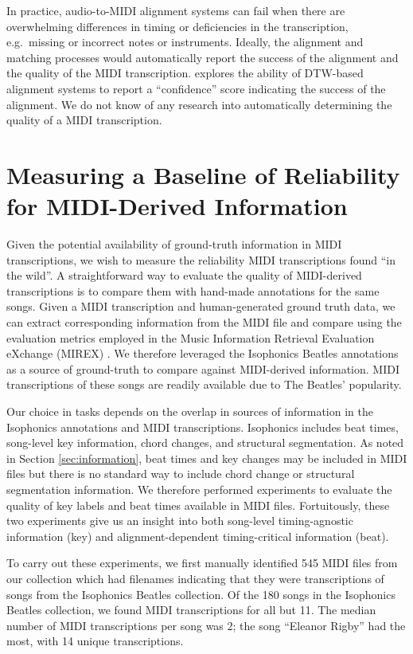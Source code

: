 \documentclass{article}
\begin{document}
In practice, audio-to-MIDI alignment systems can fail when there are overwhelming differences in timing or deficiencies in the transcription, e.g.\ missing or incorrect notes or instruments.
Ideally, the alignment and matching processes would automatically report the success of the alignment and the quality of the MIDI transcription.
\cite{raffel2016optimizing} explores the ability of DTW-based alignment systems to report a ``confidence'' score indicating the success of the alignment.
We do not know of any research into automatically determining the quality of a MIDI transcription.


\section{Measuring a Baseline of Reliability for MIDI-Derived Information}
\label{sec:measuring}

Given the potential availability of ground-truth information in MIDI transcriptions, we wish to measure the reliability MIDI transcriptions found ``in the wild''.
A straightforward way to evaluate the quality of MIDI-derived transcriptions is to compare them with hand-made annotations for the same songs.
Given a MIDI transcription and human-generated ground truth data, we can extract corresponding information from the MIDI file and compare using the evaluation metrics employed in the Music Information Retrieval Evaluation eXchange (MIREX) \cite{downie2008music}.
We therefore leveraged the Isophonics Beatles annotations \cite{mauch2009omras2} as a source of ground-truth to compare against MIDI-derived information.  MIDI transcriptions of these songs are readily available due to The Beatles' popularity.

Our choice in tasks depends on the overlap in sources of information in the Isophonics annotations and MIDI transcriptions.
Isophonics includes beat times, song-level key information, chord changes, and structural segmentation.
As noted in Section \ref{sec:information}, beat times and key changes may be included in MIDI files but there is no standard way to include chord change or structural segmentation information.
We therefore performed experiments to evaluate the quality of key labels and beat times available in MIDI files.
Fortuitously, these two experiments give us an insight into both song-level timing-agnostic information (key) and alignment-dependent timing-critical information (beat).

To carry out these experiments, we first manually identified 545 MIDI files from our collection which had filenames indicating that they were transcriptions of songs from the Isophonics Beatles collection.
Of the 180 songs in the Isophonics Beatles collection, we found MIDI transcriptions for all but 11.
The median number of MIDI transcriptions per song was 2; the song ``Eleanor Rigby'' had the most, with 14 unique transcriptions.
\end{document}
